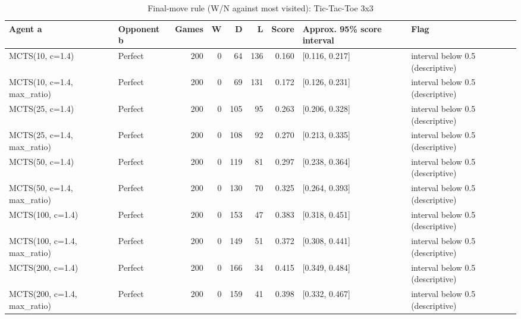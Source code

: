 \begin{table}[!t]
\centering
\caption{Final-move rule (W/N against most visited): Tic-Tac-Toe 3x3}
\label{tab:final_ttt3}
\small
\begin{tabular}{llrrrrrll}
\toprule
Agent a & Opponent b & Games & W & D & L & Score & Approx. 95\% score interval & Flag \\
\midrule
MCTS(10, c=1.4) & Perfect & 200 & 0 & 64 & 136 & 0.160 & [0.116, 0.217] & interval below 0.5 (descriptive) \\
MCTS(10, c=1.4, max\_ratio) & Perfect & 200 & 0 & 69 & 131 & 0.172 & [0.126, 0.231] & interval below 0.5 (descriptive) \\
MCTS(25, c=1.4) & Perfect & 200 & 0 & 105 & 95 & 0.263 & [0.206, 0.328] & interval below 0.5 (descriptive) \\
MCTS(25, c=1.4, max\_ratio) & Perfect & 200 & 0 & 108 & 92 & 0.270 & [0.213, 0.335] & interval below 0.5 (descriptive) \\
MCTS(50, c=1.4) & Perfect & 200 & 0 & 119 & 81 & 0.297 & [0.238, 0.364] & interval below 0.5 (descriptive) \\
MCTS(50, c=1.4, max\_ratio) & Perfect & 200 & 0 & 130 & 70 & 0.325 & [0.264, 0.393] & interval below 0.5 (descriptive) \\
MCTS(100, c=1.4) & Perfect & 200 & 0 & 153 & 47 & 0.383 & [0.318, 0.451] & interval below 0.5 (descriptive) \\
MCTS(100, c=1.4, max\_ratio) & Perfect & 200 & 0 & 149 & 51 & 0.372 & [0.308, 0.441] & interval below 0.5 (descriptive) \\
MCTS(200, c=1.4) & Perfect & 200 & 0 & 166 & 34 & 0.415 & [0.349, 0.484] & interval below 0.5 (descriptive) \\
MCTS(200, c=1.4, max\_ratio) & Perfect & 200 & 0 & 159 & 41 & 0.398 & [0.332, 0.467] & interval below 0.5 (descriptive) \\
\bottomrule
\end{tabular}
\end{table}
